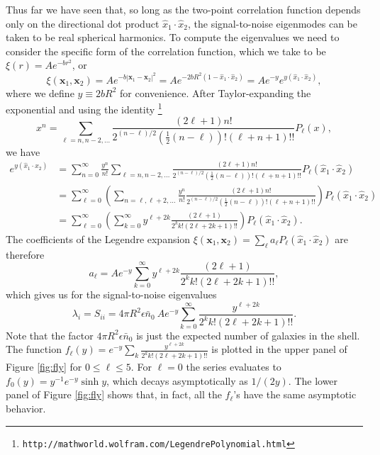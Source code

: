 \documentclass{article}
\renewcommand{\vec}[1]{\bm{#1}}
\newcommand{\nbar}{\bar{n}}
\begin{document}
Thus far we have seen that, so long as the two-point correlation function
depends only on the directional dot product $\hat{x}_1\cdot\hat{x}_2$, the
signal-to-noise eigenmodes can be taken to be real spherical harmonics.  To
compute the eigenvalues we need to consider the specific form of the
correlation function, which we take to be $\xi(r) = A e^{-br^2}$, or
\begin{equation}
    \xi(\vec{x}_1,\vec{x}_2)
        = A e^{-b|\vec{x}_1-\vec{x}_2|^2}
        = A e^{-2bR^2(1 - \hat{x}_1\cdot\hat{x}_2)}
        = A e^{-y} e^{y (\hat{x}_1\cdot\hat{x}_2)},
\end{equation}
where we define $y \equiv 2bR^2$ for convenience.  After Taylor-expanding
the exponential and using the identity
\footnote{\texttt{http://mathworld.wolfram.com/LegendrePolynomial.html}}
\begin{equation}
    x^n = \sum_{\ell=n,n-2,\dots} \frac{(2\ell+1) n!}{2^{(n-\ell)/2} \left(\frac{1}{2}(n-\ell)\right)! (\ell+n+1)!!} P_\ell(x),
\end{equation}
we have
\begin{align}
    e^{y(\hat{x}_1\cdot\hat{x}_2)}
        &= \sum_{n=0}^\infty \frac{y^n}{n!} \sum_{\ell=n,n-2,\dots} \frac{(2\ell+1) n!}{2^{(n-\ell)/2} \left(\frac{1}{2}(n-\ell)\right)! (\ell+n+1)!!} P_\ell(\hat{x}_1\cdot\hat{x}_2) \\
        &= \sum_{\ell=0}^\infty \left( \sum_{n=\ell,\ell+2,\dots} \frac{y^n}{n!} \frac{(2\ell+1) n!}{2^{(n-\ell)/2} \left(\frac{1}{2}(n-\ell)\right)! (\ell+n+1)!!} \right) P_\ell(\hat{x}_1\cdot\hat{x}_2) \\
        &= \sum_{\ell=0}^\infty \left( \sum_{k=0}^\infty y^{\ell+2k} \frac{(2\ell+1)}{2^k k! (2\ell+2k+1)!!} \right) P_\ell(\hat{x}_1\cdot\hat{x}_2).
\end{align}
The coefficients of the Legendre expansion
$\xi(\vec{x}_1,\vec{x}_2) = \sum_\ell a_\ell P_\ell(\hat{x}_1\cdot\hat{x}_2)$
are therefore
\begin{equation}
    a_\ell = A e^{-y} \sum_{k=0}^\infty y^{\ell+2k} \frac{(2\ell+1)}{2^k k! (2\ell+2k+1)!!},
\end{equation}
which gives us for the signal-to-noise eigenvalues
\begin{equation}
    \lambda_i = S_{ii} = 4\pi R^2 \epsilon \nbar_0 ~ A e^{-y} \sum_{k=0}^\infty \frac{y^{\ell+2k}}{2^k k! (2\ell+2k+1)!!}.
\end{equation}
Note that the factor $4\pi R^2\epsilon \nbar_0$ is just the expected number
of galaxies in the shell.  The function
$f_\ell(y) = e^{-y} \sum_k \frac{y^{\ell+2k}}{2^k k! (2\ell+2k+1)!!}$
is plotted in the upper panel of Figure \ref{fig:fly} for $0 \le \ell \le 5$.
For $\ell = 0$ the series evaluates to $f_0(y) = y^{-1} e^{-y} \sinh y$, which
decays asymptotically as $1/(2y)$.  The lower panel of Figure \ref{fig:fly}
shows that, in fact, all the $f_\ell$'s have the same asymptotic behavior.
\end{document}
